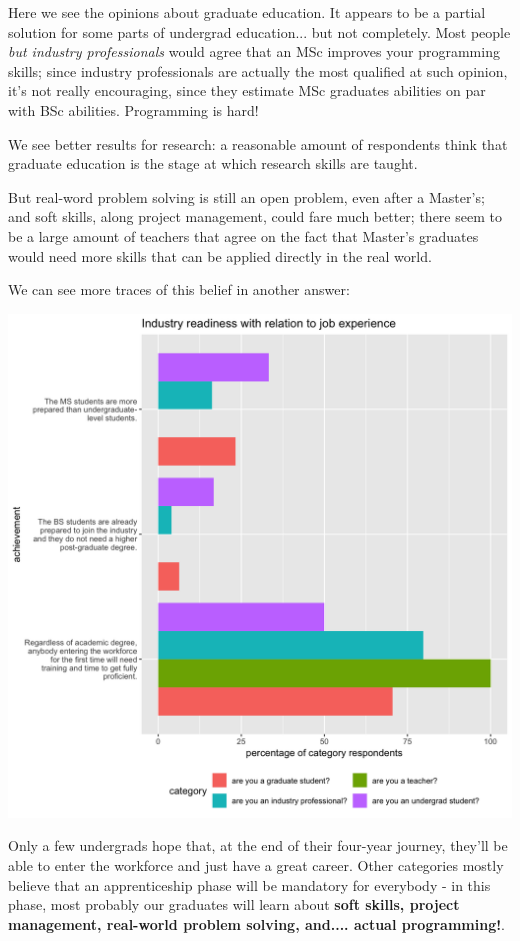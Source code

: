 \documentclass{sigchi}
\begin{document}
Here we see the opinions about graduate education. It appears to be a partial solution for some parts of undergrad education... but not completely. Most people \textit{but industry professionals} would agree that an MSc improves your programming skills; since industry professionals are actually the most qualified at such opinion, it's not really encouraging, since they estimate MSc graduates abilities on par with BSc abilities. Programming is hard!

We see better results for research: a reasonable amount of respondents think that graduate education is the  stage at which research skills are taught.

But real-word problem solving is still an open problem, even after a Master's; and soft skills, along project management, could fare much better; there seem to be a large amount of teachers that agree on the fact that Master's graduates would need more skills that can be applied directly in the real world.

We can see more traces of this belief in another answer:

\includegraphics[scale=0.2]{../data-analysis/plots_output/Industry_readiness_with_relation_to_job_experience.png}

Only a few undergrads hope that, at the end of their four-year journey, they'll be able to enter the workforce and just have a great career. Other categories mostly believe that an apprenticeship phase will be mandatory for everybody - in this phase, most probably our graduates will learn about \textbf{soft skills, project management, real-world problem solving, and.... actual programming!}.
\end{document}
